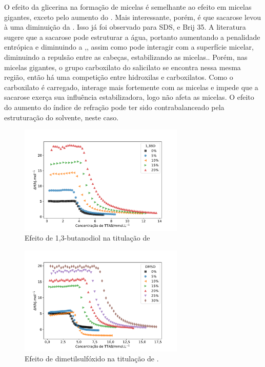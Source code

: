			O efeito da glicerina na formação de micelas é semelhante ao efeito em micelas gigantes, exceto pelo aumento do \DHmic{}.\cite{Moya2007a} Mais interessante, porém, é que sacarose levou à uma diminuição da \cmc{}. Isso já foi observado para SDS\cite{Bakshi1993a, Chauhan2014}, \CTAB\cite{Banipal2016a} e Brij 35\cite{Sharma1989}. A literatura sugere que a sacarose pode estruturar a água, portanto aumentando a penalidade entrópica e diminuindo a \cmc,\cite{Chauhan2014, Banipal2016a, Sharma1989}, assim como pode interagir com a superfície micelar, diminuindo a repulsão entre as cabeças, estabilizando as micelas.\cite{Bakshi1993a, Chauhan2014, Banipal2016a}. Porém, nas micelas gigantes, o grupo carboxilato do salicilato se encontra nessa mesma região, então há uma competição entre hidroxilas e carboxilatos. Como o carboxilato é carregado, interage mais fortemente com as micelas e impede que a sacarose exerça sua influência estabilizadora, logo não afeta as micelas. O efeito do aumento do índice de refração pode ter sido contrabalanceado pela estruturação do solvente, neste caso.
			
			\begin{figure}[h]
				\centering
				\includegraphics[width=0.7\textwidth]{imagens/itc/ITC_13BD}
				\caption{Efeito de 1,3-butanodiol na titulação de \TTAB}
				\label{fig:itc_13bd}
			\end{figure}  
		
			\begin{figure}[h]
				\centering
				\includegraphics[width=0.7\textwidth]{imagens/itc/ITC_dmso}
				\caption{Efeito de dimetilsulfóxido na titulação de \TTAB.}
				\label{fig:itc_dmso}
			\end{figure} 
			
